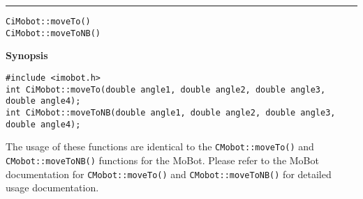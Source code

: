 \noindent
\vspace{5pt}
\rule{6.5in}{0.015in}
\noindent
{\LARGE \texttt{CiMobot::moveTo()}}\\
{\LARGE \texttt{CiMobot::moveToNB()}}\\
{}

\noindent
{\bf Synopsis}\\
\begin{verbatim}
#include <imobot.h>
int CiMobot::moveTo(double angle1, double angle2, double angle3, double angle4);
int CiMobot::moveToNB(double angle1, double angle2, double angle3, double angle4);
\end{verbatim}

The usage of these functions are identical to the
\texttt{CMobot::moveTo()} and \texttt{CMobot::moveToNB()} functions for the MoBot.
Please refer to the MoBot documentation for \texttt{CMobot::moveTo()} and
\texttt{CMobot::moveToNB()} for
detailed usage documentation.

